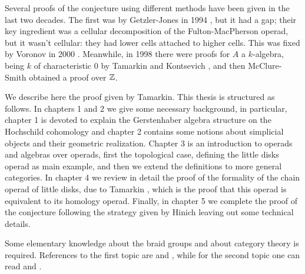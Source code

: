\documentclass[TFM.tex]{subfiles}
\begin{document}
Several proofs of the conjecture using different methods have been given in the last two decades. The first was by Getzler-Jones in 1994 \cite{GJ}, but it had a gap; their key ingredient was a cellular decomposition of the Fulton-MacPherson operad, but it wasn’t cellular: they had
lower cells attached to higher cells. This was fixed by Voronov in 2000 \cite{VO}. Meanwhile, in 1998 there were proofs for $A$ a $k$-algebra, being $k$ of characteristic 0 by Tamarkin and Kontsevich \cite{tk} , and then McClure-Smith \cite{McClure} obtained a proof over $\mathbb{Z}$.


We describe here the proof given by Tamarkin. This thesis is structured as follows. In chapters 1 and 2 we give some necessary background, in particular, chapter 1 is devoted to explain the Gerstenhaber algebra structure on the Hochschild cohomology and chapter 2 contains some notions about simplicial objects and their geometric realization. Chapter 3 is an introduction to operads and algebras over operads, first the topological case, defining the little disks operad as main example, and then we extend the definitions to more general categories. In chapter 4 we review in detail the proof of the formality of the chain operad of little disks, due to Tamarkin \cite{TD}, which is the proof that this operad is equivalent to its homology operad. Finally, in chapter 5 we complete the proof of the conjecture following the strategy given by Hinich \cite{Hinich} leaving out some technical details. 

Some elementary knowledge about the braid groups and about category theory is required. References to the first topic are \cite{tfg} and \cite{Meneses}, while for the second topic one can read \cite{working} and \cite{Diego}.




%
%
%
%
\end{document}
